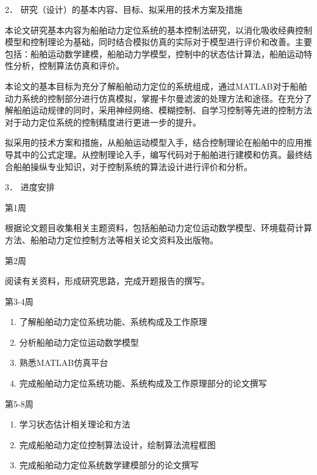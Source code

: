 \documentclass[a4paper]{ctexart}
\begin{document}
\begin{mdframed}
{\large \fangsong 
\begin{flushleft}
2．	研究（设计）的基本内容、目标、拟采用的技术方案及措施
\end{flushleft}

本论文研究基本内容为船舶动力定位系统的基本控制法研究，以消化吸收经典控制模型和控制理论为基础，同时结合模拟仿真的实际对于模型进行评价和改善。主要包括：船舶运动数学建模，船舶动力学模型，控制中的状态估计算法，船舶运动特性分析，控制算法仿真和评价。

本论文的基本目标为充分了解船舶动力定位的系统组成，通过MATLAB对于船舶动力系统的控制部分进行仿真模拟，掌握卡尔曼滤波的处理方法和途径。在充分了解船舶运动规律的同时，采用神经网络、模糊控制、自学习控制等先进的控制方法对于动力定位系统的控制精度进行更进一步的提升。

拟采用的技术方案和措施，从船舶运动模型入手，结合控制理论在船舶中的应用推导其中的公式定理。从控制理论入手，编写代码对于船舶进行建模和仿真。最终结合船舶操纵专业知识，对于控制系统的算法设计进行评价和分析。 

\begin{flushleft}
3．	进度安排
\end{flushleft}

第1周 

根据论文题目收集相关主题资料，包括船舶动力定位运动数学模型、环境载荷计算方法、船舶动力定位控制方法等相关论文资料及出版物。

第2周 

阅读有关资料，形成研究思路，完成开题报告的撰写。

第3-4周 
\begin{enumerate}
\item 了解船舶动力定位系统功能、系统构成及工作原理
\item 分析船舶动力定位运动数学模型
\item 熟悉MATLAB仿真平台
\item 完成船舶动力定位系统功能、系统构成及工作原理部分的论文撰写

\end{enumerate}

第5-8周 
\begin{enumerate}
\item 学习状态估计相关理论和方法
\item 完成船舶动力定位控制算法设计，绘制算法流程框图
\item 完成船舶动力定位系统数学建模部分的论文撰写
\end{enumerate}

}
\end{mdframed}
\end{document}
